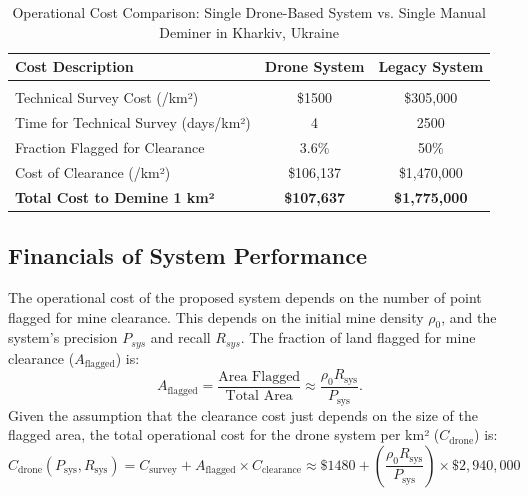 \begin{table}[h!]
\centering
\caption{Operational Cost Comparison: Single Drone-Based System vs. Single Manual Deminer in Kharkiv, Ukraine}
\label{tab:cost_comparison_structured}
\begin{tabular}{lcc} 
\toprule
\textbf{Cost Description} & \textbf{Drone System} & \textbf{Legacy System} \\
\midrule
\multicolumn{3}{l}{}\\
Technical Survey Cost (/km²) & \$1500 & \$305,000 \\ 
Time for Technical Survey (days/km²) &  4 & 2500 \tablefootnote{\url{https://apopo.org/what-we-do/detecting-landmines-and-explosives/how-we-do-it/mine-clearance/}} \\ 
Fraction Flagged for Clearance & 3.6\% & 50\% \\ 
Cost of Clearance (/km²) & \$106,137 & \$1,470,000 \\
 \addlinespace
\textbf{Total Cost to Demine 1 km² } & \textbf{\$107,637} & \textbf{\$1,775,000}  \\
\bottomrule
\end{tabular}
\end{table}

\subsection{Financials of System Performance} \label{subsec:performance_savings}

The operational cost of the proposed system depends on the number of point flagged for mine clearance. This depends on the initial mine density $\rho_0$, and the system's precision $P_{sys}$ and recall $R_{sys}$. The fraction of land flagged for mine clearance ($A_\text{flagged}$) is:
\begin{equation}
A_{\text{flagged}} = \frac{\text{Area Flagged}}{\text{Total Area}} \approx  \frac{\rho_0 R_\text{sys}}{P_\text{sys}}. 
\label{eq:flags_fraction} %
\end{equation}
Given the assumption that the clearance cost just depends on the size of the flagged area, the total operational cost for the drone system per km² ($C_{\text{drone}}$) is:
\begin{equation}
C_{\text{drone}}(P_\text{sys}, R_\text{sys}) = C_{\text{survey}} + A_{\text{flagged}} \times C_{\text{clearance}} 
\approx \$1480 + \left( \frac{\rho_0 R_\text{sys}}{P_\text{sys}} \right) \times \$2,940,000 
\label{eq:drone_op_cost} %
\end{equation}



